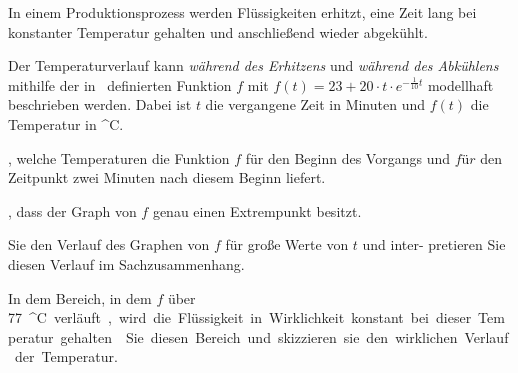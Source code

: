 \documentclass[11pt, a5paper, landscape, final]{scrartcl}
\begin{document}
	\begin{aufgabe}
		In einem Produktionsprozess werden Flüssigkeiten erhitzt, eine Zeit lang bei konstanter Temperatur gehalten und anschließend wieder abgekühlt.
		
		Der Temperaturverlauf kann \emph{während des Erhitzens} und \emph{während des Abkühlens} mithilfe der in \R\ definierten Funktion $f$ mit $f(t) = 23 + 20\cdot t\cdot e^{-\tfrac{1}{10}t}$ modellhaft beschrieben werden. Dabei ist $t$ die vergangene Zeit in Minuten und $f(t)$ die Temperatur in \si{^\circ C}.
		
		\begin{enumeratea}
			\item {}, welche Temperaturen die Funktion $f$ für den Beginn des Vorgangs und $für$ den Zeitpunkt zwei Minuten nach diesem Beginn liefert.
			\item {}, dass der Graph von $f$ genau einen Extrempunkt besitzt.
			\item {}  Sie den Verlauf des Graphen von $f$ für große Werte von $t$ und inter-
			pretieren Sie diesen Verlauf im Sachzusammenhang.
			\item In dem Bereich, in dem $f$ über \SI{77}{^\circ C} verläuft, wird die Flüssigkeit in Wirklichkeit konstant bei dieser Temperatur gehalten.
			
			 Sie diesen Bereich und skizzieren sie den wirklichen Verlauf der Temperatur.
		\end{enumeratea}
	\end{aufgabe}
	\clearpage
	
\end{document}
